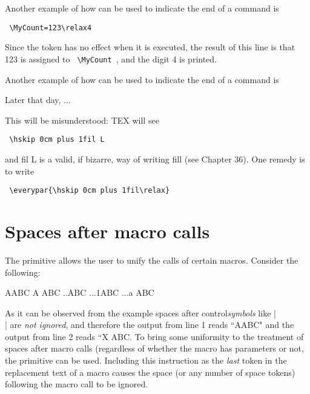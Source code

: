 Another example of how \cmd{\relax} can be used to indicate the end of a command is

\verb+ \MyCount=123\relax4+

\begin{codeexample}[]
\newcount\MyCount
{}\par
\the\MyCount
\end{codeexample}

\noindent Since the  token has no effect when it is executed, the result of this line is that 123 is
assigned to \verb+ \MyCount +, and the digit 4 is printed.

Another example of how  can be used to indicate the end of a command is


\begin{teX}
\indent Later that day, ...
\end{teX}

\noindent This will be misunderstood: TEX will see

\verb+ \hskip 0cm plus 1fil L+

\noindent and fil L is a valid, if bizarre, way of writing fill (see Chapter 36). One remedy is to write

\verb+ \everypar{\hskip 0cm plus 1fil\relax}+

\section{Spaces after macro calls}

\CMDI{\ignorespaces}
The primitive \cmd{\ignorespaces} allows the user to unify the calls of certain macros. Consider the following:

\begin{codeexample}[]
\bgroup
\def\\{A}
\def\xx{..}
\def\yy{...}

\\ABC
\\ ABC
\xx ABC
\yy{1}ABC
\yy{a} ABC
\egroup
\end{codeexample}

As it can be observed from the example spaces after control\textit{symbols} like |\\| are \emph{not ignored}, and therefore the output from line 1 reads ``AABC" and the output from line 2 reads ``X ABC. To bring some uniformity to the treatment of spaces after macro calls (regardless of whether the macro has parameters or not, the \cmd{\ignorespaces} primitive can be used. Including this instruction as the \emph{last} token in the replacement text of a macro causes the space (or any number of space tokens) following the macro call to be ignored.

